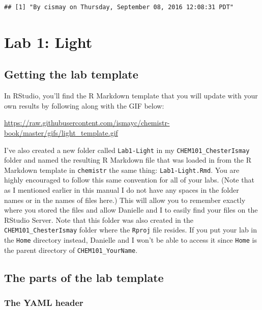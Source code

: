 \documentclass[]{tufte-book}
\begin{document}
\begin{verbatim}
## [1] "By cismay on Thursday, September 08, 2016 12:08:31 PDT"
\end{verbatim}

\chapter{Lab 1: Light}\label{light}

\section{Getting the lab template}\label{getting-the-lab-template}

In RStudio, you'll find the R Markdown template that you will update
with your own results by following along with the GIF below:

\vspace{0.1in}

\begin{center}\footnotesize{\url{https://raw.githubusercontent.com/ismayc/chemistr-book/master/gifs/light_template.gif}}\end{center}

\vspace{0.1in}

I've also created a new folder called \texttt{Lab1-Light} in my
\texttt{CHEM101\_ChesterIsmay} folder and named the resulting R Markdown
file that was loaded in from the R Markdown template in
\texttt{chemistr} the same thing: \texttt{Lab1-Light.Rmd}. You are
highly encouraged to follow this same convention for all of your labs.
(Note that as I mentioned earlier in this manual I do not have any
spaces in the folder names or in the names of files here.) This will
allow you to remember exactly where you stored the files and allow
Danielle and I to easily find your files on the RStudio Server. Note
that this folder was also created in the \texttt{CHEM101\_ChesterIsmay}
folder where the \texttt{Rproj} file resides. If you put your lab in the
\texttt{Home} directory instead, Danielle and I won't be able to access
it since \texttt{Home} is the parent directory of
\texttt{CHEM101\_YourName}.

\section{The parts of the lab
template}\label{the-parts-of-the-lab-template}

\subsection{The YAML header}\label{the-yaml-header}
\end{document}
